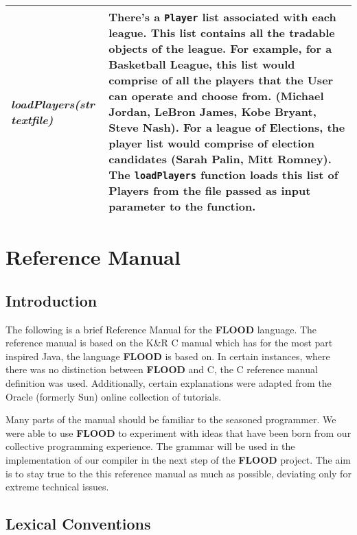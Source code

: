 \documentclass[12pt]{report}
\begin{document}
\begin{flushleft}
\begin{singlespace}
\begin{tabular}{ l | p{11cm} }
\\
\textit{loadPlayers(str textfile)} & There's a \texttt{Player} list associated with each league. This list contains all the tradable objects of the league. For example, for a Basketball League, this list would comprise of all the players that the User can operate and choose from. (Michael Jordan, LeBron James, Kobe Bryant, Steve Nash). For a league of Elections, the player list would comprise of election candidates (Sarah Palin, Mitt Romney). The \texttt{loadPlayers} function loads this list of Players from the file passed as input parameter to the function. \\
\hline
\end{tabular}
\end{singlespace}
\end{flushleft}

\chapter{Reference Manual}

\section{Introduction}

The following is a brief Reference Manual for the \textbf{FLOOD} language. The reference manual is based on the K\&R C manual which has for the most part inspired Java, the language \textbf{FLOOD} is based on. In certain instances, where there was no distinction between \textbf{FLOOD} and C, the C reference manual definition was used. Additionally, certain explanations were adapted from the Oracle (formerly Sun) online collection of tutorials. 

Many parts of the manual should be familiar to the seasoned programmer. We were able to use \textbf{FLOOD} to experiment with ideas that have been born from our collective programming experience. The grammar will be used in the implementation of our compiler in the next step of the \textbf{FLOOD} project. The aim is to stay true to the this reference manual as much as possible, deviating only for extreme technical issues. 

\section{Lexical Conventions}
\end{document}

